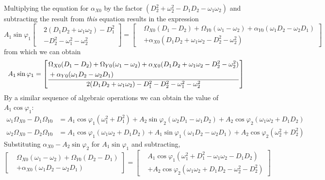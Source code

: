 Multiplying the equation for $\alpha_{X0}$ by the factor
$(D_2^2 + \omega_2^2 - D_1 D_2 - \omega_1\omega_2)$ and subtracting the result
from \emph{this} equation results in the expression
\begin{equation*}
A_1\sin\varphi_1\left[\begin{aligned}
&2(D_1 D_2 + \omega_1\omega_2) - D_1^2\\
&- D_2^2 - \omega_1^2 - \omega_2^2
\end{aligned}\right]
=
\left[\begin{aligned}
&\Omega_{X0}(D_1 - D_2) + \Omega_{Y0}(\omega_1 - \omega_2)
  + \alpha_{Y0}(\omega_1 D_2 - \omega_2 D_1)\\
&+ \alpha_{X0}(D_1 D_2 + \omega_1\omega_2 - D_2^2 - \omega_2^2)
\end{aligned}\right]
\end{equation*}
from which we can obtain
\begin{equation*}
A_1\sin\varphi_1 = \left[\vcenter{\hbox{$\displaystyle\frac{\begin{aligned}
&\Omega_{X0}(D_1 - D_2) + \Omega_{Y0}(\omega_1 - \omega_2)
  + \alpha_{X0}(D_1 D_2 + \omega_1\omega_2 - D_2^2 - \omega_2^2)\\
&+ \alpha_{Y0}(\omega_1 D_2 - \omega_2 D_1)
\end{aligned}}{2(D_1 D_2 + \omega_1\omega_2) - D_1^2 - D_2^2
  - \omega_1^2 - \omega_2^2}$}}\right]
\end{equation*}
By a similar sequence of algebraic operations we can obtain the value of
$A_1\cos\varphi_1$:
\begin{align*}
\omega_1\Omega_{X0} - D_1\Omega_{Y0}
  &= A_1\cos\varphi_1(\omega_1^2 + D_1^2)
   + A_2\sin\varphi_2(\omega_2 D_1 - \omega_1 D_2)
   + A_2\cos\varphi_2(\omega_1\omega_2 + D_1 D_2)\\
\omega_2\Omega_{X0} - D_2\Omega_{Y0}
  &= A_1\cos\varphi_1(\omega_1\omega_2 + D_1 D_2)
   + A_1\sin\varphi_1(\omega_1 D_2 - \omega_2 D_1)
   + A_2\cos\varphi_2(\omega_2^2 + D_2^2)
\end{align*}
Substituting $\alpha_{X0} - A_2\sin\varphi_2$ for $A_1\sin\varphi_1$ and
subtracting,
\begin{equation*}
\left[\begin{aligned}
&\Omega_{X0}(\omega_1 - \omega_2) + \Omega_{Y0}(D_2 - D_1)\\
&+ \alpha_{X0}(\omega_1 D_2 - \omega_2 D_1)
\end{aligned}\right]
=
\left[\begin{aligned}
&A_1\cos\varphi_1(\omega_1^2 + D_1^2 - \omega_1\omega_2 - D_1 D_2)\\
&+ A_2\cos\varphi_2(\omega_1\omega_2 + D_1 D_2 - \omega_2^2 - D_2^2)
\end{aligned}\right]
\end{equation*}
